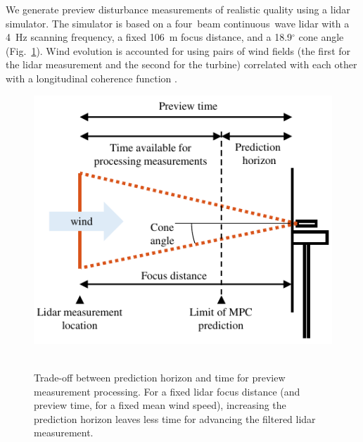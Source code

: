 \documentclass[letterpaper, 10 pt, conference]{ieeeconf}  %
\begin{document}
We generate preview disturbance measurements of realistic quality using a lidar simulator. The simulator is based on a four~beam continuous~wave lidar with a 4~Hz scanning frequency,  a fixed 106~m focus distance, and a 18.9$^\circ$ cone angle (Fig.~\ref{fig:horizons}). Wind evolution is accounted for using pairs of wind fields (the first for the lidar measurement and the second for the turbine) correlated with each other with a longitudinal coherence function \cite{SimleyPao2015}. 
\begin{figure}[thbp]
	\centering
	\mbox{\includegraphics[scale=1.0]{prediction_horizon_geo.pdf}
	}
	\caption{Trade-off between prediction horizon and time for preview measurement processing. For a fixed lidar focus distance (and preview time, for a fixed mean wind speed), increasing the prediction horizon leaves less time for advancing the filtered lidar measurement.}
	\label{fig:horizons}
\end{figure}
\end{document}
